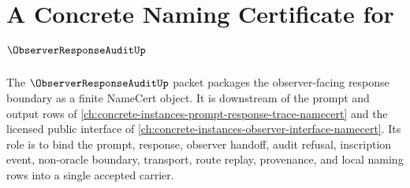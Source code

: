 \chapter{A Concrete Naming Certificate for $\ObserverResponseAuditUp$}
\label{ch:concrete-instances-observer-response-audit-namecert}

The $\ObserverResponseAuditUp$ packet packages the observer-facing response boundary as a finite NameCert object. It is downstream of the prompt and output rows of \autoref{ch:concrete-instances-prompt-response-trace-namecert} and the licensed public interface of \autoref{ch:concrete-instances-observer-interface-namecert}. Its role is to bind the prompt, response, observer handoff, audit refusal, inscription event, non-oracle boundary, transport, route replay, provenance, and local naming rows into a single accepted carrier.

